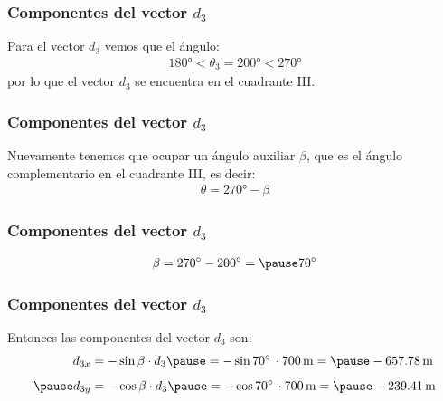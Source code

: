 \documentclass[12pt]{beamer}
\begin{document}
\begin{frame}
\frametitle{Componentes del vector $d_{3}$}
Para el vector $d_{3}$ vemos que el ángulo:
\pause
\begin{eqnarray*}
\ang{180} < \theta_{3} = \ang{200} < \ang{270}
\end{eqnarray*}
\pause
por lo que el vector $d_{3}$ se encuentra en el cuadrante III.
\end{frame}
\begin{frame}
\frametitle{Componentes del vector $d_{3}$}
Nuevamente tenemos que ocupar un ángulo auxiliar $\beta$, que es el ángulo complementario en el cuadrante III, es decir:
\pause
\begin{align*}
\theta = \ang{270} - \beta
\end{align*}
\end{frame}
\begin{frame}
\frametitle{Componentes del vector $d_{3}$}
\begin{eqnarray*}
\beta = \ang{270} - \ang{200} = \pause \ang{70}
\end{eqnarray*}
\pause
\vspace*{-1cm}
\begin{figure}
\centering
{}
\end{figure}
\end{frame}
\begin{frame}
\frametitle{Componentes del vector $d_{3}$}
\begin{figure}
  \centering
{}
\end{figure}
Entonces las componentes del vector $d_{3}$ son:
\pause
\begin{eqnarray*}
\begin{aligned}
d_{3x} &= -\sin \beta \cdot d_{3} \pause = -\sin \ang{70} \, \cdot \SI{700}{\meter} = \pause -\SI{657.78}{\meter} \\[0.5em] \pause
d_{3y} &= -\cos \beta \cdot d_{3} \pause = -\cos \ang{70} \, \cdot \SI{700}{\meter} = \pause -\SI{239.41}{\meter}
\end{aligned}
\end{eqnarray*}
\end{frame}
\end{document}
